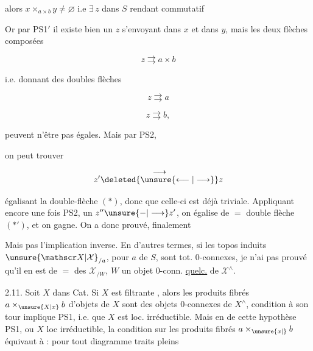 alors $x\times_{a\times b}y\ne\varnothing$ i.e $\exists\,z$ dans $S$ rendant commutatif


Or par PS1$'$ il existe bien un $z$ s'envoyant dans $x$ et dans $y$, mais les deux flèches composées

\[
z\rightrightarrows a\times b
\]

i.e. donnant des doubles flèches

\[
z\rightrightarrows a \tag*{$(*)$}
\]

\[
z\rightrightarrows b, \tag*{$(*')$}
\]

peuvent n'être pas égales. Mais par PS2,


on peut trouver

\[
z'\overset{\displaystyle\longrightarrow}{\deleted{\unsure{\longleftarrow|\longrightarrow}}}z
\]

égalisant la double-flèche $(*)$, donc  que celle-ci est déjà triviale. Appliquant encore une fois PS2,   un $z''\unsure{\mathbin{-}|\longrightarrow}z'$, on égalise de $=$  double flèche $(*')$, et on gagne. On a donc prouvé, finalement


Mais pas l'implication inverse. En d'autres termes, si les topos induits $\unsure{\mathscr X|\mathcal X}_{/a}$, pour $a$ de $S$, sont  tot. $0$-connexes, je  n'ai pas prouvé qu'il en est de $=$ des $\mathscr X_{/W}$, $W$ un objet $0$-conn. \uline{quelc.} de $\mathscr X^\wedge$.  

\uline{} 2.11. Soit $X$ dans Cat.  Si $X$ est  filtrante , alors  les produits fibrés $a\times_{\unsure{X|x}}b$ d'objets de $X$ sont des objets $0$-connexes de $X^\wedge$,   condition à son tour implique PS1, i.e. que $X$ est loc. irréductible. Mais en  de cette hypothèse PS1, ou $X$ loc irréductible, la condition sur les produits fibrés $a\times_{\unsure{x|\vphantom{x}}}b$ équivaut à   :  pour tout diagramme traits pleins

